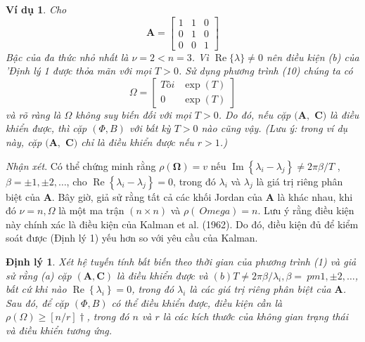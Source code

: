\documentclass[12pt,a4paper]{article}
\newtheorem{dl}{Định lý}
\newtheorem{vd}{Ví dụ}
\begin{document}

\begin{vd}
Cho 
$$
\mathbf{A}=\left[\begin{array}{lll}
	1 & 1 & 0 \\
	0 & 1 & 0 \\
	0 & 0 & 1
\end{array}\right]
$$
Bậc của đa thức nhỏ nhất là $\nu=2<n=3$. Vì $\operatorname{Re}\{\lambda\} \neq 0$ nên điều kiện (b) của 'Định lý 1 được thỏa mãn với mọi $T>0$. Sử dụng phương trình (10) chúng ta có
$$
\Omega=\left[\begin{array}{ll}
	Tôi & \exp (T) \\
	0 & \exp (T)
\end{array}\right]
$$
và rõ ràng là $\Omega$ không suy biến đối với mọi $T>0$. Do đó, nếu cặp $(\boldsymbol{A},$ $\boldsymbol{C})$ là điều khiển được, thì cặp $(\Phi, B)$ với bất kỳ $T>0$ nào cũng vậy. (Lưu ý: trong ví dụ này, cặp $(\boldsymbol{A},$ $\boldsymbol{C})$ chỉ là điều khiển được nếu $r>1$.)	
\end{vd}



\textit{Nhận xét}. Có thể chứng minh rằng $\rho(\boldsymbol{\Omega})=v$ nếu $\operatorname{Im}\left\{\lambda_i-\lambda_j\right\} \neq 2 \pi \beta / T$ , $\beta= \pm 1, \pm 2, \ldots$, cho $\operatorname{Re}\left\{\lambda_i-\lambda_j\right\}=0$, trong đó $\lambda_i$ và $\lambda_j $ là giá trị riêng phân biệt của $\boldsymbol{A}$.
Bây giờ, giả sử rằng tất cả các khối Jordan của $\mathbf{A}$ là khác nhau, khi đó $\nu=n, \Omega$ là một ma trận $(n \times n)$ và $\rho(\ Omega)=n$. Lưu ý rằng điều kiện này chính xác là điều kiện của Kalman et al. (1962). Do đó, điều kiện đủ để kiểm soát được (Định lý 1) yếu hơn so với yêu cầu của Kalman.


\begin{dl}\label{dl2}
Xét hệ tuyến tính bất biến theo thời gian của phương trình (1) và giả sử rằng (a) cặp $(\mathbf{A}, \mathbf{C})$ là điều khiển được và $(b) T \neq 2 \pi \beta / \lambda_i, \beta= \ pm 1, \pm 2, \ldots$, bất cứ khi nào $\operatorname{Re}\left\{\lambda_i\right\}=0$, trong đó $\lambda_i$ là các giá trị riêng phân biệt của $\mathbf{A }$. Sau đó, để cặp $(\Phi, B)$ có thể điều khiển được, điều kiện cần là $\rho(\Omega) \geqslant[n / r] \dagger$, trong đó $n$ và $r$ là các kích thước của không gian trạng thái và điều khiển tương ứng.	
\end{dl}
\end{document}
